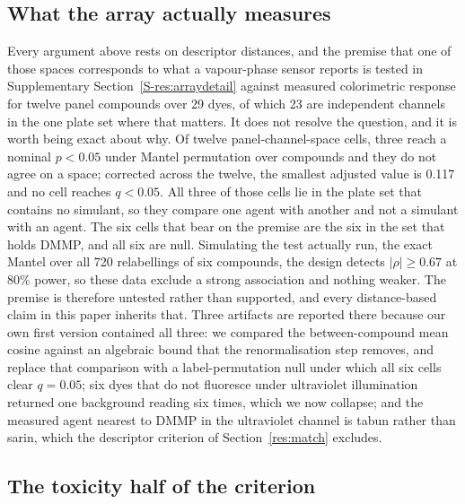 \documentclass[1p,times]{elsarticle}
\begin{document}
\subsection{What the array actually measures}
\label{res:measured}

Every argument above rests on descriptor distances, and the premise that one of
those spaces corresponds to what a vapour-phase sensor reports is tested in
Supplementary Section~\ref{S-res:arraydetail} against measured colorimetric
response for twelve panel compounds over 29 dyes, of which 23 are independent
channels in the one plate set where that matters. It does not resolve the
question, and it is worth being exact about why. Of twelve
panel-channel-space cells, three reach a nominal
$p<0.05$ under Mantel permutation over compounds and they do not agree on a
space; corrected across the twelve, the
smallest adjusted value is 0.117 and no cell reaches $q<0.05$. All three of
those cells lie in the plate set that contains no simulant, so they compare one
agent with another and not a simulant with an agent. The six cells that bear on
the premise are the six in the set that holds DMMP, and all six are null.
Simulating the test actually run, the exact Mantel over all 720 relabellings of
six compounds, the design detects $|\rho| \ge 0.67$ at 80\% power, so these data
exclude a strong association and nothing weaker. The premise is therefore
untested rather than supported, and every distance-based claim in this paper
inherits that. Three artifacts are
reported there because our own
first version contained all three: we compared the between-compound mean cosine
against an algebraic bound that the renormalisation step removes, and replace
that comparison with a label-permutation null under which all six cells clear
$q = 0.05$; six dyes that do not fluoresce under ultraviolet illumination returned
one background reading six times, which we now collapse; and the measured agent
nearest to DMMP in the ultraviolet channel is tabun rather than sarin, which the
descriptor criterion of Section~\ref{res:match} excludes.

\subsection{The toxicity half of the criterion}
\label{res:toxsummary}
\end{document}

